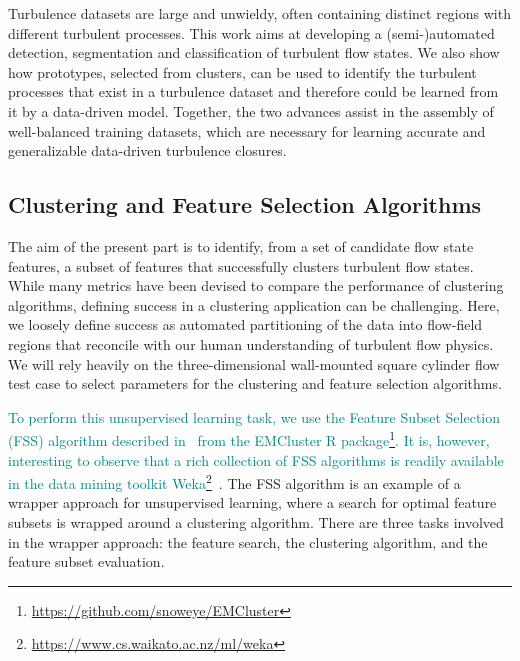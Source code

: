 Turbulence datasets are large and unwieldy, often containing distinct regions with different turbulent
processes. This work aims at developing a (semi-)automated detection, segmentation and classiﬁcation of turbulent ﬂow states. We also show how prototypes, selected from clusters, can be used to identify the turbulent processes that exist in a turbulence dataset and therefore could be learned from it by a data-driven model. Together, the two advances assist in the assembly of well-balanced training datasets, which are necessary for learning accurate and generalizable data-driven turbulence closures.

\subsection{Clustering and Feature Selection Algorithms}
\label{subsec:clustering_feature_selection}

The aim of the present part is to identify, from a set of candidate ﬂow state features, a subset of features that successfully clusters turbulent ﬂow states. While many metrics have been devised to compare the performance of clustering algorithms, deﬁning success in a clustering application can be challenging. Here, we loosely deﬁne success as automated partitioning of the data into ﬂow-ﬁeld regions that reconcile with our human understanding of turbulent ﬂow physics. We will rely heavily on the three-dimensional wall-mounted square cylinder ﬂow test case to select parameters for the clustering and feature selection algorithms. %

\textcolor{teal}{To perform this unsupervised learning task, we use the Feature Subset Selection (FSS) algorithm described in~\cite{dy2004feature} from the EMCluster R package\footnote{\url{https://github.com/snoweye/EMCluster}}. It is, however, interesting to observe that a rich collection of FSS algorithms is readily available in the data mining toolkit Weka\footnote{\url{https://www.cs.waikato.ac.nz/ml/weka}}~\cite{hall2009weka}}. The FSS algorithm is an example of a wrapper approach for unsupervised learning, where a search for optimal feature subsets is wrapped around a clustering algorithm. There are three tasks involved in the wrapper approach: the feature search, the clustering algorithm, and the feature subset evaluation.

